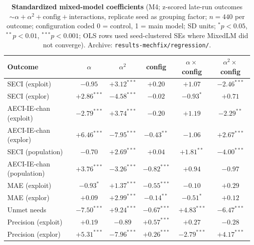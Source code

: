 \documentclass[11pt]{article}
\begin{document}
\begin{table}[h!]
\centering
\caption{\textbf{Standardized mixed-model coefficients} (M4;
z-scored late-run outcomes $\sim \alpha + \alpha^2 + \mathrm{config} +
\mathrm{interactions}$, replicate seed as grouping factor; $n = 440$ per
outcome; configuration coded 0 = control, 1 = main model; SD units;
$^{*}p<0.05$, $^{**}p<0.01$, $^{***}p<0.001$; OLS rows used
seed-clustered SEs where MixedLM did not converge). Archive:
\texttt{results-mechfix/regression/}.}\label{tab:s6-regression}
\footnotesize
\begin{tabular}{@{}lccccc@{}}
\toprule
Outcome & $\alpha$ & $\alpha^2$ & config & $\alpha \times$ config & $\alpha^2 \times$ config \\
\midrule
SECI (exploit) & $-0.95$ & $+3.12^{***}$ & $+0.20$ & $+1.07$ & $-2.46^{***}$ \\
SECI (explor) & $+2.86^{***}$ & $-4.58^{***}$ & $-0.02$ & $-0.93^{*}$ & $+0.71$ \\
AECI-IE-chan (exploit) & $-2.79^{***}$ & $+3.74^{***}$ & $-0.20$ & $+1.19$ & $-2.29^{**}$ \\
AECI-IE-chan (explor) & $+6.46^{***}$ & $-7.95^{***}$ & $-0.43^{**}$ & $-1.06$ & $+2.67^{***}$ \\
SECI (population) & $-0.70$ & $+2.69^{***}$ & $+0.04$ & $+1.81^{**}$ & $-4.00^{***}$ \\
AECI-IE-chan (population) & $+3.76^{***}$ & $-3.26^{***}$ & $-0.82^{***}$ & $+0.94$ & $-0.97$ \\
MAE (exploit) & $-0.93^{*}$ & $+1.37^{***}$ & $-0.55^{***}$ & $-0.10$ & $+0.29$ \\
MAE (explor) & $+0.09$ & $+2.99^{***}$ & $-0.14^{**}$ & $-0.51^{*}$ & $+0.12$ \\
Unmet needs & $-7.50^{***}$ & $+9.24^{***}$ & $-0.67^{***}$ & $+4.83^{***}$ & $-6.47^{***}$ \\
Precision (exploit) & $+0.19$ & $-0.89$ & $+0.57^{***}$ & $+0.27$ & $-0.28$ \\
Precision (explor) & $+5.31^{***}$ & $-7.96^{***}$ & $+0.26^{***}$ & $-2.79^{***}$ & $+4.17^{***}$ \\
\bottomrule
\end{tabular}
\end{table}
\end{document}
